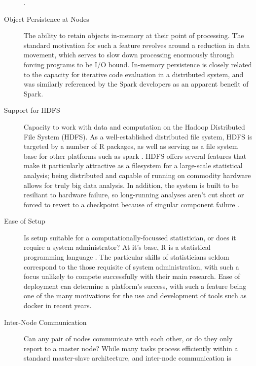\documentclass[a4paper,10pt]{article}
\begin{document}
\begin{description}
		\cite{zaharia2010spark}.
	\item[Object Persistence at Nodes]
	      The ability to retain objects in-memory at their point of
	      processing.
	      The standard motivation for such a feature revolves around a
	      reduction in data movement, which serves to slow down
	      processing enormously through forcing programs to be I/O bound.
	      In-memory persistence is closely related to the capacity for
	      iterative code evaluation in a distributed system, and was
	      similarly referenced by the Spark developers as an
	      apparent benefit of Spark\cite{zaharia2010spark}.
	\item[Support for HDFS]
	      Capacity to work with data and computation on the Hadoop
	      Distributed File System (HDFS).
	      As a well-established distributed file system, HDFS is targeted
	      by a number of R packages, as well as serving as a file
	      system base for other platforms such as spark
	      \cite{analytics:_rhadoop_wiki} \cite{deltarho:_rhipe}
	      \cite{urbanek20} \cite{zaharia2016apache}.
	      HDFS offers several features that make it particularly
	      attractive as a filesystem for a large-scale statistical
	      analysis;
	      being distributed and capable of running on commodity hardware
	      allows for truly big data analysis.
	      In addition, the system is built to be resiliant to hardware
	      failure, so long-running analyses aren't cut short or forced to
	      revert to a checkpoint because of singular component failure
	      \cite{shvachko2010hadoop}.
	\item[Ease of Setup]
	      Is setup suitable for a computationally-focussed
	      statistician, or does it require a system administrator?
	      At it's base, R is a statistical programming language
	      \cite{rcore2020intro}.
	      The particular skills of statisticians seldom correspond to the
	      those requisite of system administration, with such a focus
	      unlikely to compete successfully with their main research.
	      Ease of deployment can determine a platform's success, with
	      such a feature being one of the many motivations for the use
	      and development of tools such as docker in recent years.
	\item[Inter-Node Communication]
	      Can any pair of nodes communicate with each other, or do they
	      only report to a master node?
	      While many tasks process efficiently within a standard
	      master-slave architecture, and inter-node communication is

\end{description}
\end{document}
